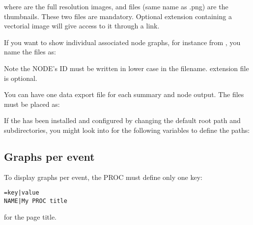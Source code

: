 \hspace{15pt}

where  are the full resolution images, and  files (same name as .png) are the thumbnails. These two files are mandatory. Optional  extension containing a vectorial image will give access to it through a link.

If you want to show individual associated node graphs, for instance from , you name the files as:

\hspace{15pt}

Note the NODE's ID must be written in lower case in the filename.  extension file is optional.

You can have one data export file for each summary and node output. The files must be placed as:

\hspace{15pt}


If the \webobs has been installed and configured by changing the default root path and subdirectories, you might look into  for the following variables to define the paths:

\hspace{15pt}

\hspace{15pt}



\subsection{Graphs per event}

To display graphs per event, the PROC must define only one key:

\begin{lstlisting}[title=MYPROC.conf]
=key|value
NAME|My PROC title
\end{lstlisting}

for the page title.

